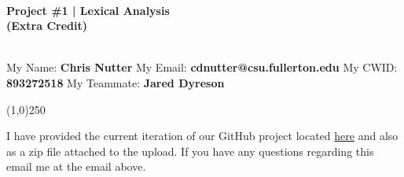 \documentclass[12pt,a4paper]{article}
\begin{document}
\obeylines

\begin{center}
    \LARGE\textbf{\\Project \#1 | Lexical Analysis\\\large(Extra Credit)\\}
\end{center}
\normalsize

\noindent \\My Name: \textbf{Chris Nutter}
\noindent My Email: \textbf{cdnutter@csu.fullerton.edu}
\noindent My CWID: \textbf{893272518}
\noindent My Teammate: \textbf{Jared Dyreson}
    \begin{center}\line(1,0){250}\end{center}

\noindent I have provided the current iteration of our GitHub project located \href{https://github.com/JaredDyreson/Diablo/tree/devbranch/lexical_analysis}{here} and also as a zip file attached to the upload. If you have any questions regarding this email me at the email above. 
\end{document}
